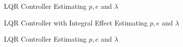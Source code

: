 \begin{figure}
  \caption{LQR Controller Estimating $p, e$ and $\lambda$}
  \label{fig:LQR_Estimator}
\end{figure}

\begin{figure}[p]
  \caption{LQR Controller with Integral Effect Estimating $p, e$ and $\lambda$}
  \label{fig:LQRIntegralEffect_Estimator}
\end{figure}
\restoregeometry

\begin{figure}
  \caption{LQR Controller Estimating $p, e$ and $\lambda$}
  \label{fig:LQR_Estimator}
\end{figure}

